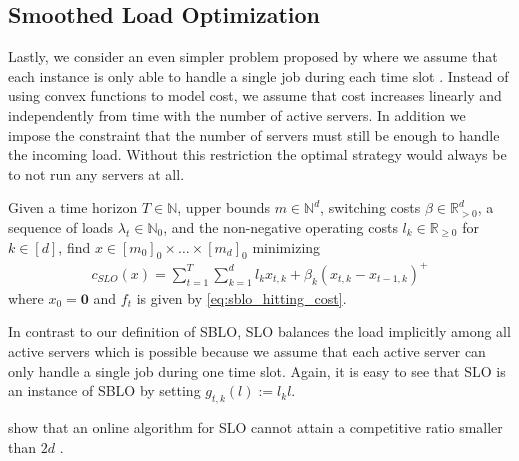 \subsection{Smoothed Load Optimization}

Lastly, we consider an even simpler problem proposed by \citeauthor*{Albers2021} where we assume that each instance is only able to handle a single job during each time slot \cite{Albers2021}. Instead of using convex functions to model cost, we assume that cost increases linearly and independently from time with the number of active servers. In addition we impose the constraint that the number of servers must still be enough to handle the incoming load. Without this restriction the optimal strategy would always be to not run any servers at all.

\begin{problem}\label{problem:sblo}
Given a time horizon $T \in \mathbb{N}$, upper bounds $m \in \mathbb{N}^d$, switching costs $\beta \in \mathbb{R}_{>0}^d$, a sequence of loads $\lambda_t \in \mathbb{N}_0$, and the non-negative operating costs $l_k \in \mathbb{R}_{\geq 0}$ for $k \in [d]$, find $x \in [m_0]_0 \times \dots \times [m_d]_0$ minimizing \begin{align*}
    c_{SLO}(x) = \sum_{t=1}^T \sum_{k=1}^d l_k x_{t,k} + \beta_k (x_{t,k} - x_{t-1,k})^+
\end{align*}
where $x_0 = \mathbf{0}$ and $f_t$ is given by \autoref{eq:sblo_hitting_cost}.
\end{problem}

In contrast to our definition of SBLO, SLO balances the load implicitly among all active servers which is possible because we assume that each active server can only handle a single job during one time slot. Again, it is easy to see that SLO is an instance of SBLO by setting $g_{t,k}(l) := l_k l$.

\citeauthor*{Albers2021} show that an online algorithm for SLO cannot attain a competitive ratio smaller than $2d$ \cite{Albers2021}.
